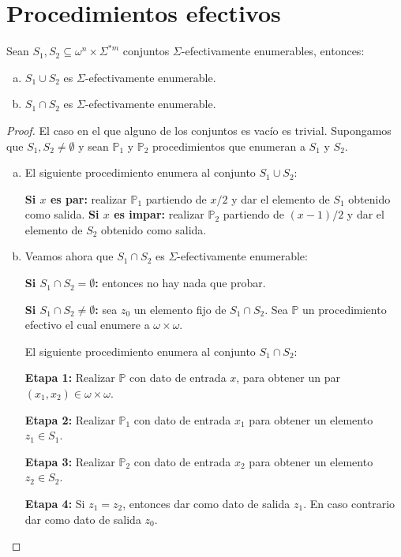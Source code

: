 \section{Procedimientos efectivos}

  \begin{lemma}
    \PN Sean $S_{1}, S_{2} \subseteq \omega^{n} \times \Sigma^{\ast m}$ conjuntos $\Sigma$-efectivamente enumerables,
    entonces:

    \begin{enumerate}[a)]
      \item $S_{1} \cup S_{2}$ es $\Sigma$-efectivamente enumerable.
      \item $S_{1} \cap S_{2}$ es $\Sigma$-efectivamente enumerable.
    \end{enumerate}
  \end{lemma}
  \begin{proof}
    \PN El caso en el que alguno de los conjuntos es vacío es trivial. Supongamos que $S_{1}, S_{2} \neq \emptyset$ y
    sean $\mathbb{P}_{1}$ y $\mathbb{P}_{2}$ procedimientos que enumeran a $S_{1}$ y $S_{2}$.

    \begin{enumerate}[a)]
      \item El siguiente procedimiento enumera al conjunto $S_{1} \cup S_{2}$:

        \textbf{Si $x$ es par:} realizar $\mathbb{P}_{1}$ partiendo de $x/2$ y dar el elemento de $S_{1}$ obtenido como
        salida.
        \textbf{Si $x$ es impar:} realizar $\mathbb{P}_{2}$ partiendo de $(x-1)/2$ y dar el elemento de $S_{2}$ obtenido
        como salida.

      \item Veamos ahora que $S_{1} \cap S_{2}$ es $\Sigma$-efectivamente enumerable:

        \textbf{Si $S_{1} \cap S_{2} = \emptyset$:} entonces no hay nada que probar.

        \textbf{Si $S_{1} \cap S_{2} \neq \emptyset$:} sea $z_{0}$ un elemento fijo de $S_{1} \cap S_{2}$. Sea
        $\mathbb{P}$ un procedimiento efectivo el cual enumere a $\omega \times \omega$.

        \vspace{3mm}
        \PN El siguiente procedimiento enumera al conjunto $S_{1} \cap S_{2}$:

        \textbf{Etapa 1:}
        Realizar $\mathbb{P}$ con dato de entrada $x$, para obtener un par $(x_{1}, x_{2}) \in \omega \times \omega $.

        \textbf{Etapa 2:}
        Realizar $\mathbb{P}_{1}$ con dato de entrada $x_{1}$ para obtener un elemento $z_{1} \in S_{1}$.

        \textbf{Etapa 3:}
        Realizar $\mathbb{P}_{2}$ con dato de entrada $x_{2}$ para obtener un elemento $z_{2} \in S_{2}$.

        \textbf{Etapa 4:}
        Si $z_{1} = z_{2}$, entonces dar como dato de salida $z_{1}$. En caso contrario dar como dato de salida $z_{0}$.
    \end{enumerate}
  \end{proof}

